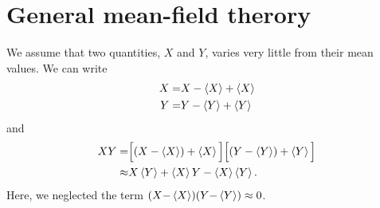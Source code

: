 \documentclass[11pt,letter, swedish, english, twocolumn
]{article}
\begin{document}
\section{General mean-field therory}
We assume that two quantities, $X$ and $Y$, varies very little from
their mean values. We can write
\begin{equation}
\begin{aligned}
X=&X-\ev{X}+\ev{X}\\
Y=&Y-\ev{Y}+\ev{Y}
\end{aligned}
\end{equation}
and
\begin{equation}
\begin{aligned}
XY=&\Big[(X-\ev{X})+\ev{X}\Big]
\Big[(Y-\ev{Y})+\ev{Y}\Big]
\\\approx&
X\ev{Y}+\ev{X}Y-\ev{X}\ev{Y}.
\end{aligned}
\end{equation}
Here, we neglected the term $(X{-}\ev{X})(Y{-}\ev{Y})\approx0$. 
\end{document}
